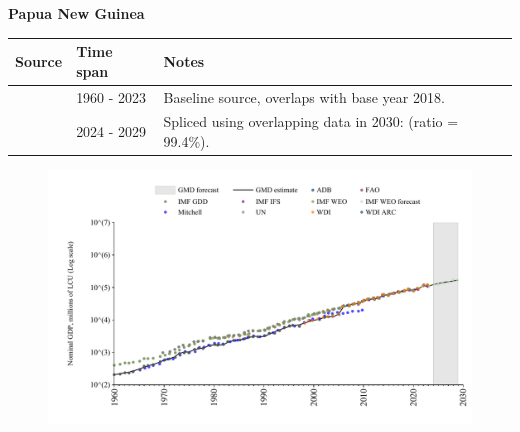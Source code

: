 \documentclass[12pt,a4paper,landscape]{article}
\begin{document}
\begin{adjustbox}{max totalsize={\paperwidth}{\paperheight},center}
\begin{minipage}[t][\textheight][t]{\textwidth}
\vspace*{0.5cm}
{}
\begin{center}
{\Large\bfseries Papua New Guinea}
\end{center}
\vspace{0.5cm}
\begin{table}[H]
\centering
\small
\begin{tabular}{|l|l|l|}
\hline
\textbf{Source} & \textbf{Time span} & \textbf{Notes} \\
\hline
\rowcolor{white}\cite{WDI}& 1960 - 2023 &Baseline source, overlaps with base year 2018.\\
\rowcolor{lightgray}\cite{IMF_WEO_forecast}& 2024 - 2029 &Spliced using overlapping data in 2030: (ratio = 99.4\%).\\
\hline
\end{tabular}
\end{table}
\begin{figure}[H]
\centering
\includegraphics[width=\textwidth,height=0.6\textheight,keepaspectratio]{graphs/PNG_nGDP.pdf}
\end{figure}
\end{minipage}
\end{adjustbox}
\end{document}
